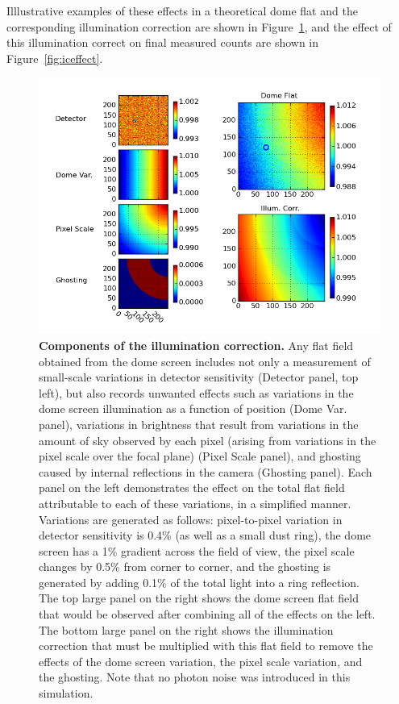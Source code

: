 \documentclass[12pt,preprint]{aastex}
\begin{document}
Illlustrative examples of these effects in a theoretical dome flat and
the corresponding illumination correction are shown in
Figure~\ref{fig:flatfield}, and the effect of this illumination
correct on final measured counts are shown in
Figure~\ref{fig:iceffect}.

\begin{figure}[htbp]
\includegraphics[width=6in]{flatfield_corr}
\caption{ {\small
{\bf Components of the illumination correction.}
Any flat field obtained from the dome screen includes not only a
measurement of small-scale variations in detector sensitivity
(Detector panel, top left), but
also records unwanted effects such as variations in the dome screen
illumination as a function of position (Dome Var. panel), variations in brightness that
result from variations in the amount of sky observed by each pixel
(arising from variations in the pixel scale over the focal plane)
(Pixel Scale panel), and
ghosting caused by internal reflections in the camera (Ghosting panel).
Each panel on the left demonstrates the effect on the total flat field
attributable to each of these variations, in a simplified manner. 
Variations are generated as follows: pixel-to-pixel variation in
detector sensitivity is 0.4\% (as well as a small dust ring), the dome
screen has a 1\% gradient across the field of view, the pixel scale
changes by 0.5\% from corner to corner, and the ghosting is generated
by adding 0.1\% of the total light into a ring reflection. 
The top large panel on the right shows the dome screen flat field that
would be observed after combining all of the effects on the left. The bottom large panel on
the right shows the illumination correction that must be multiplied with 
this flat field to remove the effects of the dome screen variation,
the pixel scale variation, and the ghosting.   Note that no photon noise was
introduced in this simulation.  \label{fig:flatfield}
} }
\end{figure}
\end{document}
